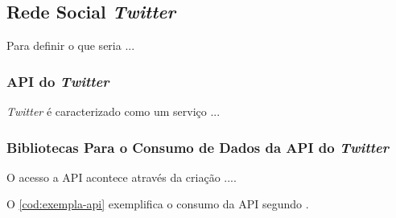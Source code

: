 \subsection{Rede Social \textit{Twitter}}
Para definir o que seria ...




\subsubsection{API do \textit{Twitter}}\label{api-twitter}
\textit{Twitter} é caracterizado como um serviço ...



\subsubsection{Bibliotecas Para o Consumo de Dados da API do \textit{Twitter}}
O acesso a API acontece através da criação ....

O \autoref{cod:exempla-api} exemplifica o consumo da API segundo .

\codigoPython






